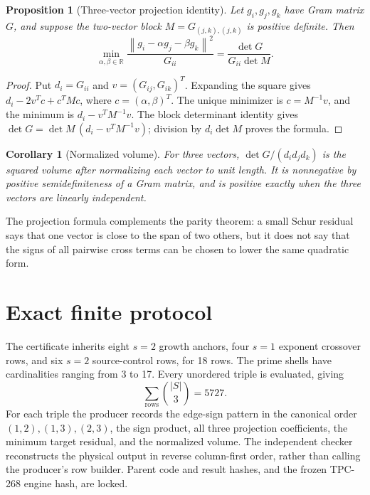 \documentclass[10pt]{article}
\newtheorem{proposition}{Proposition}
\newtheorem{corollary}{Corollary}
\newcommand{\RR}{\mathbb R}
\newcommand{\norm}[1]{\left\lVert #1\right\rVert}
\begin{document}
\begin{proposition}[Three-vector projection identity]
Let $g_i,g_j,g_k$ have Gram matrix $G$, and suppose the two-vector block
$M=G_{(j,k),(j,k)}$ is positive definite.  Then
\[
 \min_{\alpha,\beta\in\RR}
 \frac{\norm{g_i-\alpha g_j-\beta g_k}^2}{G_{ii}}
 =\frac{\det G}{G_{ii}\det M}.
 \label{eq:schur}
\]
\end{proposition}

\begin{proof}
Put $d_i=G_{ii}$ and $v=(G_{ij},G_{ik})^T$.  Expanding the square gives
$d_i-2v^Tc+c^TMc$, where $c=(\alpha,\beta)^T$.  The unique minimizer is
$c=M^{-1}v$, and the minimum is $d_i-v^TM^{-1}v$.  The block determinant
identity gives
$\det G=\det M\,(d_i-v^TM^{-1}v)$; division by $d_i\det M$ proves the
formula.
\end{proof}

\begin{corollary}[Normalized volume]
For three vectors, $\det G/(d_i d_j d_k)$ is the squared volume after
normalizing each vector to unit length.  It is nonnegative by positive
semidefiniteness of a Gram matrix, and is positive exactly when the three
vectors are linearly independent.
\end{corollary}

The projection formula complements the parity theorem: a small Schur
residual says that one vector is close to the span of two others, but it does
not say that the signs of all pairwise cross terms can be chosen to lower the
same quadratic form.

\section{Exact finite protocol}

The certificate inherits eight $s=2$ growth anchors, four $s=1$ exponent
crossover rows, and six $s=2$ source-control rows, for 18 rows.  The prime
shells have cardinalities ranging from 3 to 17.  Every unordered triple is
evaluated, giving
\[
 \sum_{\text{rows}}\binom{|S|}{3}=5727.
\]
For each triple the producer records the edge-sign pattern in the canonical
order $(1,2),(1,3),(2,3)$, the sign product, all three projection
coefficients, the minimum target residual, and the normalized volume.  The
independent checker reconstructs the physical output in reverse
column-first order, rather than calling the producer's row builder.  Parent
code and result hashes, and the frozen TPC-268 engine hash, are locked.
\end{document}
